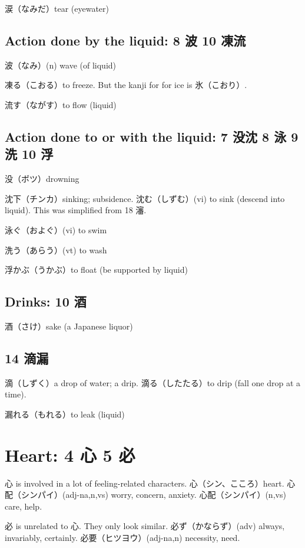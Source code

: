 涙（なみだ）tear (eyewater)

\subsection{Action done by the liquid: 8 波 10 凍流}

波（なみ）(n) wave (of liquid)

凍る（こおる）to freeze.
But the kanji for for ice is 氷（こおり）.

流す（ながす）to flow (liquid)

\subsection{Action done to or with the liquid: 7 没沈 8 泳 9 洗 10 浮}

没（ボツ）drowning

沈下（チンカ）sinking; subsidence.
沈む（しずむ）(vi) to sink (descend into liquid).
This was simplified from 18 瀋.

泳ぐ（およぐ）(vi) to swim

洗う（あらう）(vt) to wash

浮かぶ（うかぶ）to float (be supported by liquid)

\subsection{Drinks: 10 酒}

酒（さけ）sake (a Japanese liquor)

\subsection{14 滴漏}

滴（しずく）a drop of water; a drip.
滴る（したたる）to drip (fall one drop at a time).

漏れる（もれる）to leak (liquid)

\section{Heart: 4 心 5 必}

心 is involved in a lot of feeling-related characters.
心（シン、こころ）heart.
心配（シンパイ）(adj-na,n,vs) worry, concern, anxiety.
心配（シンパイ）(n,vs) care, help.

必 is unrelated to 心. They only look similar.
必ず（かならず）(adv) always, invariably, certainly.
必要（ヒツヨウ）(adj-na,n) necessity, need.

